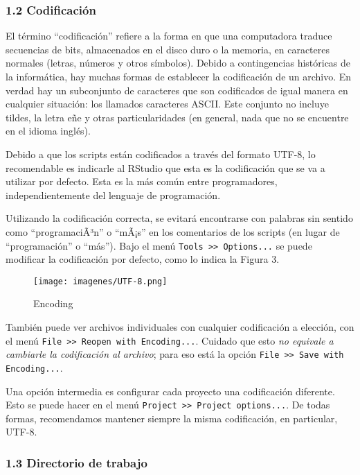 \documentclass[]{article}
\makeatletter
\def\maxwidth{\ifdim\Gin@nat@width>\linewidth\linewidth
\else\Gin@nat@width\fi}
\let\Oldincludegraphics\includegraphics
\renewcommand{\includegraphics}[1]{\Oldincludegraphics[width=\maxwidth]{#1}}
\makeatother
\begin{document}
\subsubsection{1.2 Codificación}

El término ``codificación'' refiere a la forma en que una computadora
traduce secuencias de bits, almacenados en el disco duro o la memoria,
en caracteres normales (letras, números y otros símbolos). Debido a
contingencias históricas de la informática, hay muchas formas de
establecer la codificación de un archivo. En verdad hay un subconjunto
de caracteres que son codificados de igual manera en cualquier
situación: los llamados caracteres ASCII. Este conjunto no incluye
tildes, la letra eñe y otras particularidades (en general, nada que no
se encuentre en el idioma inglés).

Debido a que los scripts están codificados a través del formato UTF-8,
lo recomendable es indicarle al RStudio que esta es la codificación que
se va a utilizar por defecto. Esta es la más común entre programadores,
independientemente del lenguaje de programación.

Utilizando la codificación correcta, se evitará encontrarse con palabras
sin sentido como ``programaciÃ³n'' o ``mÃ¡s'' en los comentarios de los
scripts (en lugar de ``programación'' o ``más''). Bajo el menú
\texttt{Tools \textgreater{}\textgreater{} Options...} se puede
modificar la codificación por defecto, como lo indica la Figura 3.

\begin{figure}[htbp]
\centering
\texttt{[image: imagenes/UTF-8.png]}
\caption{Encoding}
\end{figure}

También puede ver archivos individuales con cualquier codificación a
elección, con el menú
\texttt{File \textgreater{}\textgreater{} Reopen with Encoding...}.
Cuidado que esto \emph{no equivale a cambiarle la codificación al
archivo}; para eso está la opción
\texttt{File \textgreater{}\textgreater{} Save with Encoding...}.

Una opción intermedia es configurar cada proyecto una codificación
diferente. Esto se puede hacer en el menú
\texttt{Project \textgreater{}\textgreater{} Project options...}. De
todas formas, recomendamos mantener siempre la misma codificación, en
particular, UTF-8.

\subsubsection{1.3 Directorio de trabajo}
\end{document}
